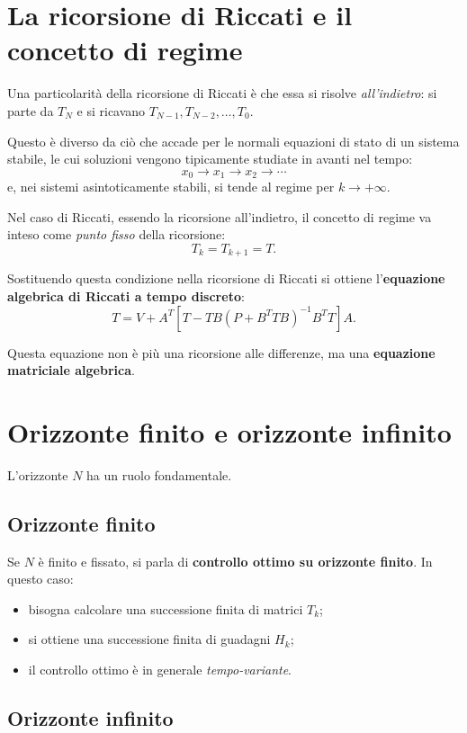 \section{La ricorsione di Riccati e il concetto di regime}

Una particolarità della ricorsione di Riccati è che essa si risolve \emph{all'indietro}:
si parte da \(T_N\) e si ricavano \(T_{N-1},T_{N-2},\dots,T_0\).

Questo è diverso da ciò che accade per le normali equazioni di stato di un sistema stabile,
le cui soluzioni vengono tipicamente studiate in avanti nel tempo:
\[
x_0 \to x_1 \to x_2 \to \cdots
\]
e, nei sistemi asintoticamente stabili, si tende al regime per \(k\to+\infty\).

Nel caso di Riccati, essendo la ricorsione all'indietro, il concetto di regime va inteso
come \emph{punto fisso} della ricorsione:
\[
T_k=T_{k+1}=T.
\]

Sostituendo questa condizione nella ricorsione di Riccati si ottiene
l'\textbf{equazione algebrica di Riccati a tempo discreto}:
\[
T
=
V
+
A^T
\left[
T
-
TB\left(P+B^T T B\right)^{-1}B^T T
\right]A.
\]

Questa equazione non è più una ricorsione alle differenze, ma una
\textbf{equazione matriciale algebrica}.

\section{Orizzonte finito e orizzonte infinito}

L'orizzonte \(N\) ha un ruolo fondamentale.

\subsection{Orizzonte finito}

Se \(N\) è finito e fissato, si parla di \textbf{controllo ottimo su orizzonte finito}.
In questo caso:
\begin{itemize}
    \item bisogna calcolare una successione finita di matrici \(T_k\);
    \item si ottiene una successione finita di guadagni \(H_k\);
    \item il controllo ottimo è in generale \emph{tempo-variante}.
\end{itemize}

\subsection{Orizzonte infinito}

